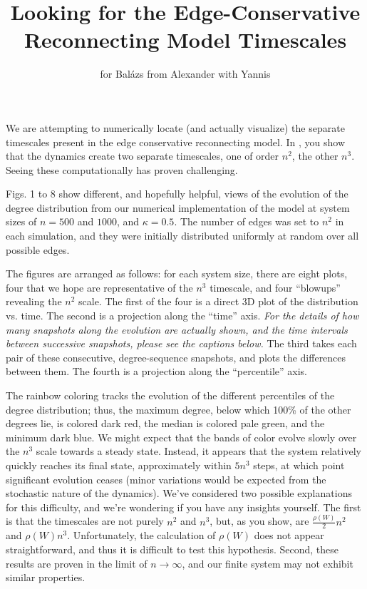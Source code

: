 \documentclass[11pt]{article}
\begin{document}
\title{\vspace{-5mm}Looking for the Edge-Conservative Reconnecting Model Timescales}
\author{for Bal\'{a}zs from Alexander with Yannis}
\maketitle

We are attempting to numerically locate (and actually visualize) the separate timescales present in the edge conservative reconnecting model. In \cite{Rath2012}, you show that the dynamics create two separate timescales, one of order $n^{2}$, the other $n^{3}$. Seeing these computationally has proven challenging. 

Figs. 1 to 8 show different, and hopefully helpful, views of the evolution of the degree distribution from our numerical implementation of the model at system sizes of $n=500$ and $1000$, and $\kappa = 0.5$. The number of edges was set to $n^{2}$ in each simulation, and they were initially distributed uniformly at random over all possible edges.

The figures are arranged as follows: for each system size, there are eight plots, four that we hope are representative of the $n^{3}$ timescale, and four ``blowups'' revealing the $n^{2}$ scale. The first of the four is a direct 3D plot of the distribution vs. time. The second is a projection along the ``time'' axis. {\em For the details of how many snapshots along the evolution are actually shown, and the time intervals between successive snapshots, please see the captions below.} The third takes each pair of these consecutive, degree-sequence snapshots, and plots the differences between them. The fourth is a projection along the ``percentile'' axis. 

The rainbow coloring tracks the evolution of the different percentiles of the degree distribution; thus, the maximum degree, below which 100\% of the other degrees lie, is colored dark red, the median is colored pale green, and the minimum dark blue. We might expect that the bands of color evolve slowly over the $n^{3}$ scale towards a steady state. Instead, it appears that the system relatively quickly reaches its final state, approximately within $5n^{3}$ steps, at which point significant evolution ceases (minor variations would be expected from the stochastic nature of the dynamics). We've considered two possible explanations for this difficulty, and we're wondering if you have any insights yourself. The first is that the timescales are not purely $n^{2}$ and $n^{3}$, but, as you show, are $\frac{\rho(W)}{2} n^{2}$ and $\rho(W) n^{3}$. Unfortunately, the calculation of $\rho(W)$ does not appear straightforward, and thus it is difficult to test this hypothesis. Second, these results are proven in the limit of $n \rightarrow \infty$, and our finite system may not exhibit similar properties.





\end{document}
